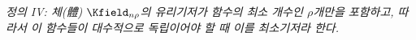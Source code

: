 
\emph{정의 IV: 체(體) $\Kfield_{n\rho}$의 유리기저가 함수의 최소 개수인 $\rho$개만을 포함하고, 따라서 이 함수들이 대수적으로 독립이어야 할 때 이를 최소기저라 한다.}
